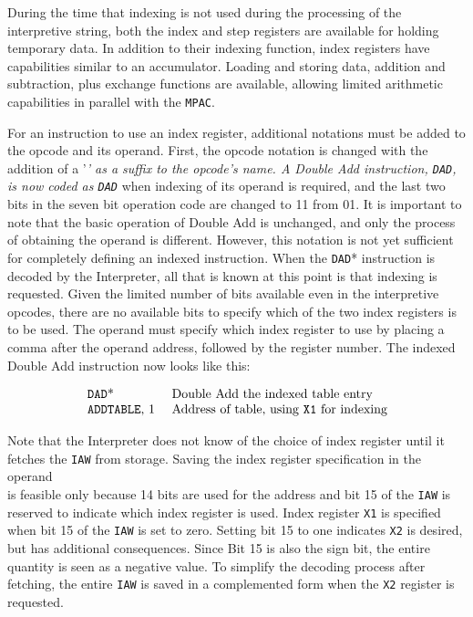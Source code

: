 \documentclass[refcap, oxford]{ahsan}
\begin{document}
During the time that indexing is not used during the processing of the interpretive string, both the index and step registers are available for holding temporary data. In addition to their indexing function, index registers have capabilities similar to an accumulator. Loading and storing data, addition and subtraction, plus exchange functions are available, allowing limited arithmetic capabilities in parallel with the \texttt{MPAC}.

For an instruction to use an index register, additional notations must be added to the opcode and its operand. First, the opcode notation is changed with the addition of a '\textit{' as a suffix to the opcode's name. A Double Add instruction, \texttt{DAD}, is now coded as \texttt{DAD}} when indexing of its operand is required, and the last two bits in the seven bit operation code are changed to 11 from 01. It is important to note that the basic operation of Double Add is unchanged, and only the process of obtaining the operand is different. However, this notation is not yet sufficient for completely defining an indexed instruction. When the \texttt{DAD}* instruction is decoded by the Interpreter, all that is known at this point is that indexing is requested. Given the limited number of bits available even in the interpretive opcodes, there are no available bits to specify which of the two index registers is to be used. The operand must specify which index register to use by placing a comma after the operand address, followed by the register number. The indexed Double Add instruction now looks like this:

$$
\begin{array}{ll}
\text { \texttt{DAD}* } & \text { Double Add the indexed table entry } \\
\text { \texttt{ADDTABLE}, } 1 & \text { Address of table, using \texttt{X1} for indexing }
\end{array}
$$

Note that the Interpreter does not know of the choice of index register until it fetches the \texttt{IAW} from storage. Saving the index register specification in the operand\\
is feasible only because 14 bits are used for the address and bit 15 of the \texttt{IAW} is reserved to indicate which index register is used. Index register \texttt{X1} is specified when bit 15 of the \texttt{IAW} is set to zero. Setting bit 15 to one indicates \texttt{X2} is desired, but has additional consequences. Since Bit 15 is also the sign bit, the entire quantity is seen as a negative value. To simplify the decoding process after fetching, the entire \texttt{IAW} is saved in a complemented form when the \texttt{X2} register is requested.
\end{document}
